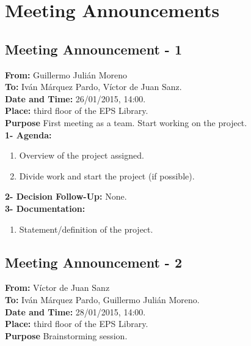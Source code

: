 \section{Meeting Announcements}

\subsection{Meeting Announcement - 1}

\textbf{From: } Guillermo Julián Moreno\\
\textbf{To: } Iván Márquez Pardo, Víctor de Juan Sanz.\\

\textbf{Date and Time: } 26/01/2015, 14:00.\\
\textbf{Place: } third floor of the EPS Library.\\

\textbf{Purpose} First meeting as a team. Start working on the project.\\

\textbf{1- Agenda:}
\begin{enumerate}
\item Overview of the project assigned.
\item Divide work and start the project (if possible).
\end{enumerate}
\textbf{2- Decision Follow-Up:} None.\\
\textbf{3- Documentation:}
\begin{enumerate}
\item Statement/definition of the project.
\end{enumerate}


\subsection{Meeting Announcement - 2}

\textbf{From: } Víctor de Juan Sanz\\
\textbf{To: } Iván Márquez Pardo, Guillermo Julián Moreno.\\

\textbf{Date and Time: } 28/01/2015, 14:00.\\
\textbf{Place: } third floor of the EPS Library.\\

\textbf{Purpose} Brainstorming session.\\

